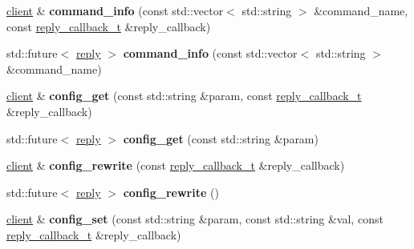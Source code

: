 \begin{DoxyCompactItemize}
\item 
\mbox{\label{classcpp__redis_1_1client_a95105c556aa5c070819bc82729d336c5}} 
\mbox{\hyperlink{classcpp__redis_1_1client}{client}} \& {\bfseries command\+\_\+info} (const std\+::vector$<$ std\+::string $>$ \&command\+\_\+name, const \mbox{\hyperlink{classcpp__redis_1_1client_af7a65eb21aa25230bfbb0b0203c4fc04}{reply\+\_\+callback\+\_\+t}} \&reply\+\_\+callback)
\item 
\mbox{\label{classcpp__redis_1_1client_abd02a4d296ed0c160e935cd176862334}} 
std\+::future$<$ \mbox{\hyperlink{classcpp__redis_1_1reply}{reply}} $>$ {\bfseries command\+\_\+info} (const std\+::vector$<$ std\+::string $>$ \&command\+\_\+name)
\item 
\mbox{\label{classcpp__redis_1_1client_a510ede75cc6361f33a4cdd0695f7543f}} 
\mbox{\hyperlink{classcpp__redis_1_1client}{client}} \& {\bfseries config\+\_\+get} (const std\+::string \&param, const \mbox{\hyperlink{classcpp__redis_1_1client_af7a65eb21aa25230bfbb0b0203c4fc04}{reply\+\_\+callback\+\_\+t}} \&reply\+\_\+callback)
\item 
\mbox{\label{classcpp__redis_1_1client_a221b1e414a4b1bb4eb2a7afaac0eb39d}} 
std\+::future$<$ \mbox{\hyperlink{classcpp__redis_1_1reply}{reply}} $>$ {\bfseries config\+\_\+get} (const std\+::string \&param)
\item 
\mbox{\label{classcpp__redis_1_1client_a8dcf862a8a0cb75f8cc986445eae81cf}} 
\mbox{\hyperlink{classcpp__redis_1_1client}{client}} \& {\bfseries config\+\_\+rewrite} (const \mbox{\hyperlink{classcpp__redis_1_1client_af7a65eb21aa25230bfbb0b0203c4fc04}{reply\+\_\+callback\+\_\+t}} \&reply\+\_\+callback)
\item 
\mbox{\label{classcpp__redis_1_1client_a1a001663bd555abb70521924ec2a27f8}} 
std\+::future$<$ \mbox{\hyperlink{classcpp__redis_1_1reply}{reply}} $>$ {\bfseries config\+\_\+rewrite} ()
\item 
\mbox{\label{classcpp__redis_1_1client_a0cff7147cd982a39cc84f91243a27364}} 
\mbox{\hyperlink{classcpp__redis_1_1client}{client}} \& {\bfseries config\+\_\+set} (const std\+::string \&param, const std\+::string \&val, const \mbox{\hyperlink{classcpp__redis_1_1client_af7a65eb21aa25230bfbb0b0203c4fc04}{reply\+\_\+callback\+\_\+t}} \&reply\+\_\+callback)

\end{DoxyCompactItemize}
